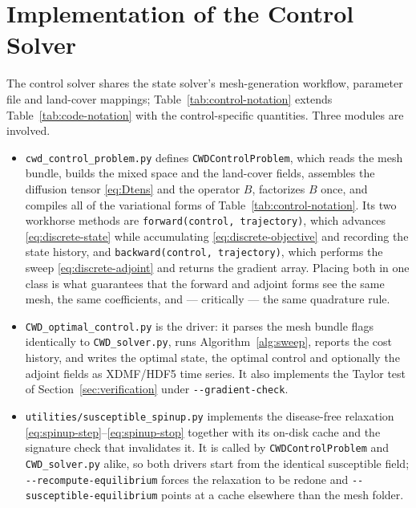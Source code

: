 \documentclass[11pt]{article}
\begin{document}
\section{Implementation of the Control Solver}
\label{sec:control-implementation}

The control solver shares the state solver's mesh-generation workflow, parameter file and land-cover mappings; Table~\ref{tab:control-notation} extends Table~\ref{tab:code-notation} with the control-specific quantities. Three modules are involved.

\begin{itemize}
\item \texttt{cwd\_control\_problem.py} defines \texttt{CWDControlProblem}, which reads the mesh bundle, builds the mixed space and the land-cover fields, assembles the diffusion tensor \eqref{eq:Dtens} and the operator $B$, factorizes $B$ once, and compiles all of the variational forms of Table~\ref{tab:control-notation}. Its two workhorse methods are \texttt{forward(control, trajectory)}, which advances \eqref{eq:discrete-state} while accumulating \eqref{eq:discrete-objective} and recording the state history, and \texttt{backward(control, trajectory)}, which performs the sweep \eqref{eq:discrete-adjoint} and returns the gradient array. Placing both in one class is what guarantees that the forward and adjoint forms see the same mesh, the same coefficients, and --- critically --- the same quadrature rule.

\item \texttt{CWD\_optimal\_control.py} is the driver: it parses the mesh bundle flags identically to \texttt{CWD\_solver.py}, runs Algorithm~\ref{alg:sweep}, reports the cost history, and writes the optimal state, the optimal control and optionally the adjoint fields as XDMF/HDF5 time series. It also implements the Taylor test of Section~\ref{sec:verification} under \texttt{-{}-gradient-check}.

\item \texttt{utilities/susceptible\_spinup.py} implements the disease-free relaxation \eqref{eq:spinup-step}--\eqref{eq:spinup-stop} together with its on-disk cache and the signature check that invalidates it. It is called by \texttt{CWDControlProblem} and \texttt{CWD\_solver.py} alike, so both drivers start from the identical susceptible field; \texttt{-{}-recompute-equilibrium} forces the relaxation to be redone and \texttt{-{}-susceptible-equilibrium} points at a cache elsewhere than the mesh folder.
\end{itemize}
\end{document}
